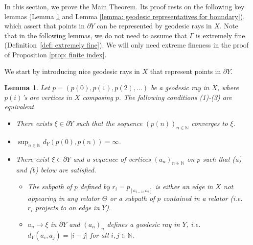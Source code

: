 \documentclass{article}[11pt]
\newtheorem{thm}{Theorem}[section]
\newtheorem{lem}[thm]{Lemma}
\newcommand{\N}{\mathbb{N}}
\begin{document}
{In this section, we prove the Main Theorem.
Its proof rests on the following key lemmas (Lemma \ref{lem:geod ray converging in Y} and Lemma \ref{lemma: geodesic representatives for boundary}), which assert that points in $\partial Y$ can be represented by geodesic rays in $X$. Note that in the following lemmas, we do not need to assume that $\Gamma$ is extremely fine (Definition~\ref{def: extremely fine}).  We will only need extreme fineness in the proof of Proposition \ref{prop: finite index}. 

{\color{black} We start by introducing nice geodesic rays in $X$ that represent points in $\partial Y$.
\begin{lem}\label{lem:geod ray converging in Y}
    Let $p=(p(0),p(1),p(2),\ldots)$ be a geodesic ray in $X$, where $p(i)$'s are vertices in $X$ composing $p$. The following conditions (1)-(3) are equivalent.
    \begin{itemize}
        \item[(1)]
        There exists $\xi \in \partial Y$ such that the sequence $(p(n))_{n \in \N}$ converges to $\xi$.
        \item[(2)]
        $\sup_{n \in \N}d_Y(p(0),p(n))= \infty$.
        \item[(3)] 
        There exist $\xi \in \partial Y$ and a sequence of vertices $(a_n)_{n \in \N}$ on $p$ such that (a) and (b) below are satisfied.
    
    \begin{itemize}
        \item[(a)] The subpath of $p$ defined by $r_i = p_{[a_{i-1}, a_i]}$ is either an edge in $X$ not appearing in any relator $\Theta$ or a subpath of $p$ contained in a relator (i.e.\ $r_i$ projects to an edge in $Y$).
        \item[(b)] $a_n \to \xi$ in $\partial Y$ and $(a_n)_n$ defines a geodesic ray in $Y$, i.e.\ $d_Y(a_i, a_j) = \vert i - j \vert$ for all $i,j \in \N$. %
    \end{itemize}
    \end{itemize}
\end{lem}

}}
\end{document}
